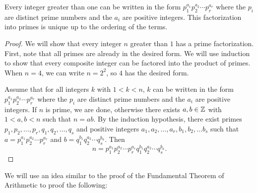 \documentclass{ximera}
\begin{document}


\begin{theorem}\label{FTA}
	Every integer greater than one can be written in the form $p_1^{a_1}p_2^{a_2}\cdots p_r^{a_r}$ where the $p_i$ are distinct prime numbers and the $a_i$ are positive integers. This factorization into primes is unique up to the ordering of the terms.

	\begin{proof}
 		We will show that every integer $n$ greater than $1$ has a prime factorization. First, note that all primes are already in the desired form. We will use induction to show that every composite integer can be factored into the product of primes. When $n=4$, we can write $n=2^2$, so $4$ has the desired form.
 
		Assume that for all integers $k$ with $1<k<n$, $k$ can be written in the form  $p_1^{a_1}p_2^{a_2}\cdots p_r^{a_r}$ where the $p_i$ are distinct prime numbers and the $a_i$ are positive integers. If $n$ is prime, we are done, otherwise there exists $a,b\in\mathbb Z$ with $1<a,b<n$ such that $n=ab$. By the induction hypothesis, there exist primes $p_1,p_2,\dots,p_r,q_1,q_2,\dots,q_s$ and positive integers $a_1,a_2,\dots,a_r,b_1,b_2,\dots b_s$ such that $a=p_1^{a_1}p_2^{a_2}\cdots p_r^{a_r}$ and $b=q_1^{b_1}q_2^{a_2}\cdots q_s^{b_a}$. Then \[n=p_1^{a_1}p_2^{a_2}\cdots p_r^{a_r}q_1^{b_1}q_2^{a_2}\cdots q_s^{b_a}.\]
	\end{proof}
\end{theorem}

We will use an idea similar to the proof of the Fundamental Theorem of Arithmetic to proof the following:
\end{document}
